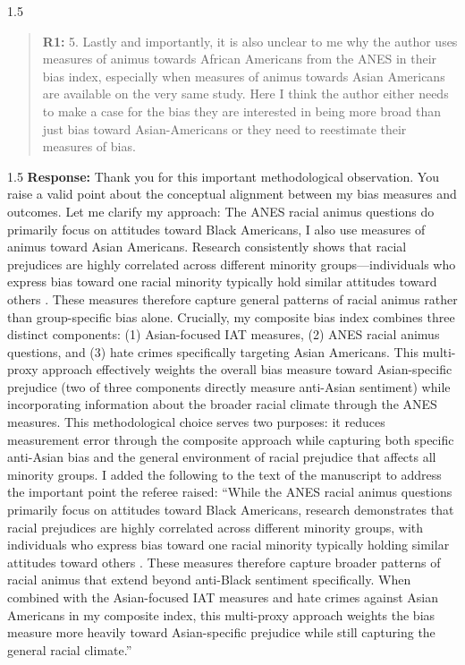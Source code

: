 \documentclass[12pt,english]{article}
\newcommand{\rrxspc}{1.5}
\begin{document}
\begin{refsection}
    \begin{spacing}{\rrxspc}
        \begin{quotation}
            \textbf{R1: } 5. Lastly and importantly, it is also unclear to me why the author uses measures of animus towards African Americans from the ANES in their bias index, especially when measures of animus towards Asian Americans are available on the very same study. Here I think the author either needs to make a case for the bias they are interested in being more broad than just bias toward Asian-Americans or they need to reestimate their measures of bias.
        \end{quotation}
    \end{spacing}

    \begin{spacing}{\rrxspc}
       \textbf{Response:} Thank you for this important methodological observation. You raise a valid point about the conceptual alignment between my bias measures and outcomes. Let me clarify my approach: The ANES racial animus questions do primarily focus on attitudes toward Black Americans, I also use measures of animus toward Asian Americans. Research consistently shows that racial prejudices are highly correlated across different minority groups—individuals who express bias toward one racial minority typically hold similar attitudes toward others \autocite{almasalkhi2023links, mora2020antiblackness}. These measures therefore capture general patterns of racial animus rather than group-specific bias alone. Crucially, my composite bias index combines three distinct components: (1) Asian-focused IAT measures, (2) ANES racial animus questions, and (3) hate crimes specifically targeting Asian Americans. This multi-proxy approach effectively weights the overall bias measure toward Asian-specific prejudice (two of three components directly measure anti-Asian sentiment) while incorporating information about the broader racial climate through the ANES measures. This methodological choice serves two purposes: it reduces measurement error through the composite approach while capturing both specific anti-Asian bias and the general environment of racial prejudice that affects all minority groups. I added the following to the text of the manuscript to address the important point the referee raised: ``While the ANES racial animus questions primarily focus on attitudes toward Black Americans, research demonstrates that racial prejudices are highly correlated across different minority groups, with individuals who express bias toward one racial minority typically holding similar attitudes toward others \autocite{almasalkhi2023links, mora2020antiblackness}. These measures therefore capture broader patterns of racial animus that extend beyond anti-Black sentiment specifically. When combined with the Asian-focused IAT measures and hate crimes against Asian Americans in my composite index, this multi-proxy approach weights the bias measure more heavily toward Asian-specific prejudice while still capturing the general racial climate.''
    \end{spacing}
    \clearpage
    \pagebreak


\end{refsection}
\end{document}
